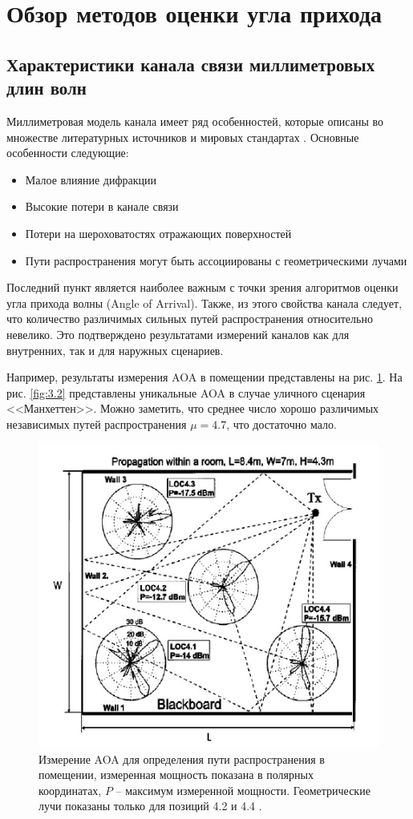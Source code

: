 \section{Обзор методов оценки угла прихода}


\subsection{Характеристики канала связи миллиметровых длин волн}
Миллиметровая модель канала имеет ряд особенностей, которые описаны во множестве
литературных источников и мировых стандартах \cite{Maltsev2010, Maltsev2017,
    Xu2002, Akdeniz2014, Rappaport2015}. Основные особенности следующие:
\begin{itemize}
    \item Малое влияние дифракции
    \item Высокие потери в канале связи
    \item Потери на шероховатостях отражающих поверхностей
    \item Пути распространения могут быть ассоциированы с геометрическими лучами
\end{itemize}

Последний пункт является наиболее важным с точки зрения алгоритмов оценки угла прихода волны 
(Angle of Arrival).
Также, из этого свойства канала следует, что количество различимых сильных путей
распространения относительно невелико. Это подтверждено результатами
измерений каналов как для внутренних, так и для наружных сценариев.

Например, результаты измерения AOA в помещении представлены на рис.
\ref{fig:3.1}.  На рис. \ref{fig:3.2} представлены уникальные AOA в случае
уличного сценария <<Манхеттен>>. Можно заметить, что среднее число хорошо
различимых независимых путей распространения $\mu=4.7$, что достаточно
мало.



\begin{figure}[ht!]
    \centering
    \includegraphics[width=0.6\linewidth]{figs/fig3.1}
    \caption{ Измерение AOA для определения пути распространения в помещении,
        измеренная мощность показана в полярных координатах, $P$ -- максимум
        измеренной мощности. Геометрические лучи показаны только для позиций
        4.2 и 4.4 \cite{Xu2002}.}
    \label{fig:3.1}
\end{figure}

